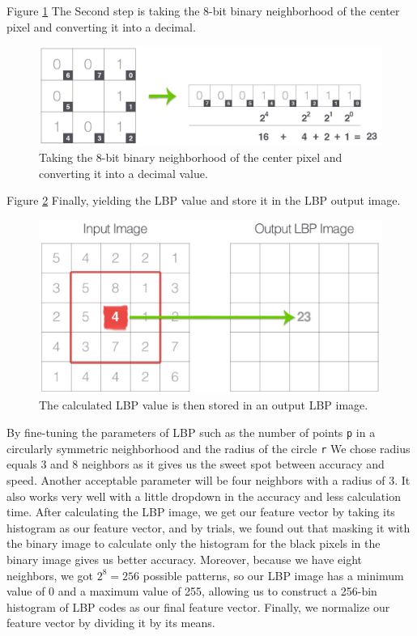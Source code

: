 Figure \ref{fig:lbp_calculation} The Second step is taking the 8-bit binary neighborhood of the center pixel and converting it into a decimal.

\begin{figure}
    \centering
    \includegraphics[width=0.9\linewidth]{../figures/lbp_calculation.jpg}
    \caption{Taking the 8-bit binary neighborhood of the center pixel and converting it into a decimal value.}
    \label{fig:lbp_calculation}
\end{figure}

Figure \ref{fig:lbp_to_output} Finally, yielding the LBP value and store it in the LBP output image.
\begin{figure}
    \centering
    \includegraphics[width=0.9\linewidth]{../figures/lbp_to_output.jpg}
    \caption{The calculated LBP value is then stored in an output LBP image.}
    \label{fig:lbp_to_output}
\end{figure}

By fine-tuning the parameters of LBP such as the number of points \texttt{p} in a circularly symmetric neighborhood and the radius of the circle \texttt{r}
We chose radius equals 3 and 8 neighbors as it gives us the sweet spot between accuracy and speed. Another acceptable parameter will be four neighbors with a radius of 3. It also works very well with a little dropdown in the accuracy and less calculation time.
After calculating the LBP image, we get our feature vector by taking its histogram as our feature vector, and by trials, we found out that masking it with the binary image to calculate only the histogram for the black pixels in the binary image gives us better accuracy.
Moreover, because we have eight neighbors, we got $2 ^ 8 = 256$ possible patterns, so our LBP image has a minimum value of 0 and a maximum value of 255, allowing us to construct a 256-bin histogram of LBP codes as our final feature vector.
Finally, we normalize our feature vector by dividing it by its means.